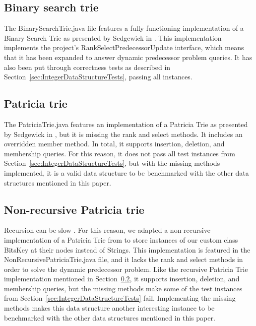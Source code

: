 \subsection{Binary search trie}
The {\ttfamily BinarySearchTrie.java} file features a fully functioning implementation of a Binary Search Trie as presented by Sedgewick in \cite{sedgewick2002algorithms}. This implementation implements the project's {\ttfamily RankSelectPredecessorUpdate} interface, which means that it has been expanded to answer dynamic predecessor problem queries. It has also been put through correctness tests as described in Section~\ref{sec:IntegerDataStructureTests}, passing all instances.

\subsection{Patricia trie} \label{sec:PatriciaTrieImplementation}

The {\ttfamily PatriciaTrie.java} features an implementation of a Patricia Trie as presented by Sedgewick in \cite{sedgewick2002algorithms}, but it is missing the {\ttfamily rank} and {\ttfamily select} methods. It includes an overridden {\ttfamily member} method. In total, it supports insertion, deletion, and membership queries. For this reason, it does not pass all test instances from Section~\ref{sec:IntegerDataStructureTests}, but with the missing methods implemented, it is a valid data structure to be benchmarked with the other data structures mentioned in this paper.

\subsection{Non-recursive Patricia trie}

Recursion can be slow \cite{shirazi2003java}. For this reason, we adapted a non-recursive implementation of a Patricia Trie from \cite{patriciaSET} to store instances of our custom class {\ttfamily BitsKey} at their nodes instead of {\ttfamily String}s. This implementation is featured in the {\ttfamily NonRecursivePatriciaTrie.java} file, and it lacks the {\ttfamily rank} and {\ttfamily select} methods in order to solve the dynamic predecessor problem. Like the recursive Patricia Trie implementation mentioned in Section~\ref{sec:PatriciaTrieImplementation}, it supports insertion, deletion, and membership queries, but the missing methods make some of the test instances from Section~\ref{sec:IntegerDataStructureTests} fail. Implementing the missing methods makes this data structure another interesting instance to be benchmarked with the other data structures mentioned in this paper.